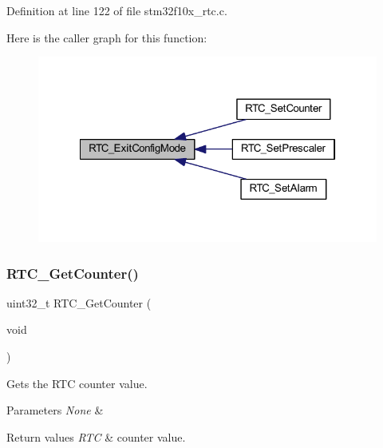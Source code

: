 Definition at line 122 of file stm32f10x\+\_\+rtc.\+c.

Here is the caller graph for this function\+:
\nopagebreak
\begin{figure}[H]
\begin{center}
\leavevmode
\includegraphics[width=322pt]{group___r_t_c___exported___functions_ga7585aa6e2dbb497173b2fd03bac0d304_icgraph}
\end{center}
\end{figure}
\mbox{\label{group___r_t_c___exported___functions_ga6edb19a0ad8414a40610341121c5ea6c}} 
\subsubsection{\texorpdfstring{R\+T\+C\+\_\+\+Get\+Counter()}{RTC\_GetCounter()}}
{\footnotesize\ttfamily uint32\+\_\+t R\+T\+C\+\_\+\+Get\+Counter (\begin{DoxyParamCaption}\item[{void}]{ }\end{DoxyParamCaption})}



Gets the R\+TC counter value. 


\begin{DoxyParams}{Parameters}
{\em None} & \\
\hline
\end{DoxyParams}

\begin{DoxyRetVals}{Return values}
{\em R\+TC} & counter value. \\
\hline
\end{DoxyRetVals}


